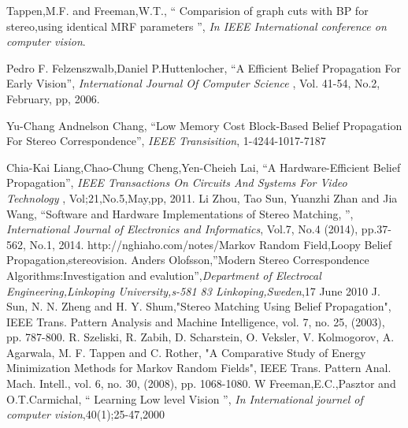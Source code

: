 \begin{thebibliography}{1}

  Tappen,M.F. and Freeman,W.T., `` Comparision of graph cuts with BP for stereo,using identical MRF parameters '', \emph{In IEEE International conference on computer vision}.


 Pedro F. Felzenszwalb,Daniel P.Huttenlocher, ``A Efficient Belief Propagation For Early Vision'', \emph{International Journal Of  Computer Science  }, Vol. 41-54, No.2, February, pp, 2006.

 Yu-Chang Andnelson Chang, ``Low Memory Cost Block-Based Belief Propagation For Stereo Correspondence'', \emph{IEEE Transisition}, 1-4244-1017-7187

 Chia-Kai Liang,Chao-Chung Cheng,Yen-Cheieh Lai, ``A Hardware-Efficient Belief Propagation'', \emph{IEEE Transactions On Circuits And Systems For Video Technology }, Vol;21,No.5,May,pp, 2011.
 Li Zhou, Tao Sun, Yuanzhi Zhan and Jia Wang, ``Software and Hardware Implementations of Stereo Matching,
'', \emph{International Journal of Electronics and Informatics}, Vol.7, No.4 (2014), pp.37-562, No.1, 2014.
 http://nghiaho.com/notes/Markov Random Field,Loopy Belief Propagation,stereovision.
 Anders Olofsson,''Modern Stereo Correspondence Algorithms:Investigation and evalution'',\emph{Department of Electrocal Engineering,Linkoping University,s-581 83 Linkoping,Sweden},17 June 2010
J. Sun, N. N. Zheng and H. Y. Shum,"Stereo Matching Using Belief Propagation", IEEE Trans. Pattern Analysis and Machine Intelligence, vol. 7, no. 25, (2003), pp. 787-800. 
R. Szeliski, R. Zabih, D. Scharstein, O. Veksler, V. Kolmogorov, A. Agarwala, M. F. Tappen and C. Rother, "A Comparative Study of Energy Minimization Methods for Markov Random Fields", IEEE Trans. Pattern Anal. Mach. Intell., vol. 6, no. 30, (2008), pp. 1068-1080.
 W Freeman,E.C.,Pasztor and O.T.Carmichal, `` Learning Low level Vision '', \emph{In International  journel of computer vision},40(1);25-47,2000


\end{thebibliography}
